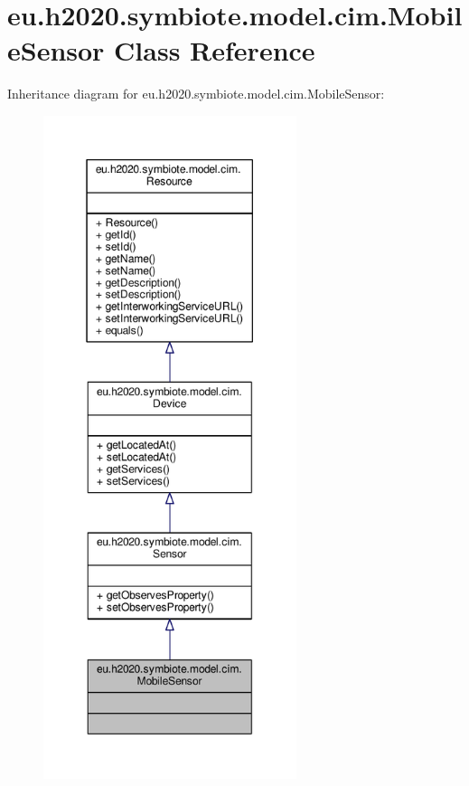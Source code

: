 \hypertarget{classeu_1_1h2020_1_1symbiote_1_1model_1_1cim_1_1MobileSensor}{}\section{eu.\+h2020.\+symbiote.\+model.\+cim.\+Mobile\+Sensor Class Reference}
\label{classeu_1_1h2020_1_1symbiote_1_1model_1_1cim_1_1MobileSensor}


Inheritance diagram for eu.\+h2020.\+symbiote.\+model.\+cim.\+Mobile\+Sensor\+:
\nopagebreak
\begin{figure}[H]
\begin{center}
\leavevmode
\includegraphics[height=550pt]{classeu_1_1h2020_1_1symbiote_1_1model_1_1cim_1_1MobileSensor__inherit__graph}
\end{center}
\end{figure}


